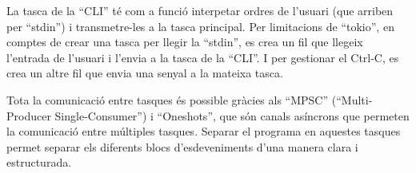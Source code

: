 \documentclass{tfgitic}[2023/06/30]
\begin{document}
La tasca de la ``CLI'' té com a funció interpetar ordres de l'usuari
(que arriben per ``stdin'') i transmetre-les a la tasca principal.
Per limitacions de ``tokio'', en comptes de crear una tasca per llegir
la ``stdin'', es crea un fil que llegeix l'entrada de l'usuari i
l'envia a la tasca de la ``CLI''. I per gestionar el Ctrl-C, es crea
un altre fil que envia una senyal a la mateixa tasca.

Tota la comunicació entre tasques és possible gràcies als ``MPSC''
(``Multi-Producer Single-Consumer'') i ``Oneshots'', que són canals
asíncrons que permeten la comunicació entre múltiples tasques. Separar
el programa en aquestes tasques permet separar els diferents blocs
d'esdeveniments d'una manera clara i estructurada.


\printbibliography
\end{document}
